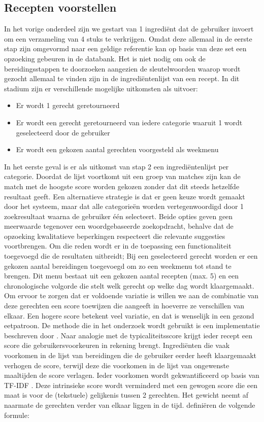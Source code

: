 \documentclass{hogent-article}
\begin{document}
\subsection{Recepten voorstellen}%

In het vorige onderdeel zijn we gestart van 1 ingrediënt dat de gebruiker invoert om een verzameling van 4 stuks te verkrijgen. Omdat deze allemaal in de eerste stap zijn omgevormd naar een geldige referentie kan op basis van deze set een opzoeking gebeuren in de databank. Het is niet nodig om ook de bereidingsstappen te doorzoeken aangezien de sleutelwoorden waarop wordt gezocht allemaal te vinden zijn in de ingrediëntenlijst van een recept. In dit stadium zijn er verschillende mogelijke uitkomsten als uitvoer:

\begin{itemize}
    \item Er wordt 1 gerecht geretourneerd
    \item Er wordt een gerecht geretourneerd van iedere categorie waaruit 1 wordt geselecteerd door de gebruiker
    \item Er wordt een gekozen aantal gerechten voorgesteld als weekmenu
\end{itemize}

In het eerste geval is er als uitkomst van stap 2 een ingrediëntenlijst per categorie. Doordat de lijst voortkomt uit een groep van matches zijn kan de match met de hoogste score worden gekozen zonder dat dit steeds hetzelfde resultaat geeft. Een alternatieve strategie is dat er geen keuze wordt gemaakt door het systeem, maar dat alle categorieën worden vertegenwoordigd door 1 zoekresultaat waarna de gebruiker één selecteert.
Beide opties geven geen meerwaarde tegenover een woordgebaseerde zoekopdracht, behalve dat de opzoeking kwalitatieve beperkingen respecteert die relevante suggesties voortbrengen. Om die reden wordt er in de toepassing een functionaliteit toegevoegd die de resultaten uitbreidt; Bij een geselecteerd gerecht worden er een gekozen aantal bereidingen toegevoegd om zo een weekmenu tot stand te brengen. Dit menu bestaat uit een gekozen aantal recepten (max. 5) en een chronologische volgorde die stelt welk gerecht op welke dag wordt klaargemaakt. Om ervoor te zorgen dat er voldoende variatie is willen we aan de combinatie van deze gerechten een score toewijzen die aangeeft in hoeverre ze verschillen van elkaar. Een hogere score betekent veel variatie, en dat is wenselijk in een gezond eetpatroon. 
De methode die in het onderzoek wordt gebruikt is een implementatie beschreven door \textcite{Ueda2011}. Naar analogie met de typicaliteitsscore krijgt ieder recept een score die gebruikersvoorkeuren in rekening brengt. Ingrediënten die vaak voorkomen in de lijst van bereidingen die de gebruiker eerder heeft klaargemaakt verhogen de score, terwijl deze die voorkomen in de lijst van ongewenste maaltijden de score verlagen. Ieder voorkomen wordt gekwantificeerd op basis van TF-IDF \autocite{Karabiber2024}. Deze intrinsieke score wordt verminderd met een gewogen score die een maat is voor de (tekstuele) gelijkenis tussen 2 gerechten. Het gewicht neemt af naarmate de gerechten verder van elkaar liggen in de tijd. \textcite{Ueda2011} definiëren de volgende formule:
\end{document}
